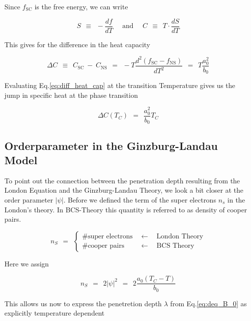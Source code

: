 \documentclass[10pt]{report}
\numberwithin{equation}{chapter}
\newcommand{\myEq}[1]{
  Eq.\ref{#1}
}
\begin{document}
Since $f_\text{SC}$ is the free energy, we can write

\begin{equation}
  S ~~\equiv~~ -\frac{df}{dT} ~~~~~~\text{and}~~~~~~ C ~~\equiv~~ T \cdot \frac{dS}{dT}
\end{equation}

This gives for the difference in the heat capacity

\begin{equation} \label{eq:diff_heat_cap}
  \Delta C ~~\equiv~~ C_\text{SC} ~-~ C_\text{NS} ~~=~~ -T \frac{d^2(f_\text{SC}-f_\text{NS})}{dT^2} 
  ~~=~~ T \frac{a_0^2}{b_0}
\end{equation}

Evaluating \myEq{eq:diff_heat_cap} at the transition Temperature gives us the jump in specific heat at the phase transition

\begin{equation}
  \Delta C(T_C) ~~=~~ \frac{a_0^2}{b_0} T_C
\end{equation}


\subsection{Orderparameter in the Ginzburg-Landau Model}

To point out the connection between the penetration depth resulting from the London Equation and the Ginzburg-Landau Theory, we look a bit closer at the order parameter $|\psi|$. Before we defined the term of the super electrons $n_s$ in the London's theory. In BCS-Theory this quantity is referred to as density of cooper pairs.

\begin{equation*}
  n_S ~~=~~ \left\{
  \begin{array}{lcr}
    \# \text{super electrons} & ~~\leftarrow~~ & \text{London Theory}\\
    \# \text{cooper pairs}    & ~~\leftarrow~~ & \text{BCS Theory}
  \end{array} \right.
\end{equation*} 


Here we assign 

\begin{equation}
  n_S ~~=~~ 2|\psi|^2 ~~=~~ 2 \frac{a_0(T_C-T)}{b_0}
\end{equation}

This allows us now to express the penetretion depth $\lambda$ from \myEq{eq:deq_B_0} as explicitly temperature dependent
\end{document}
